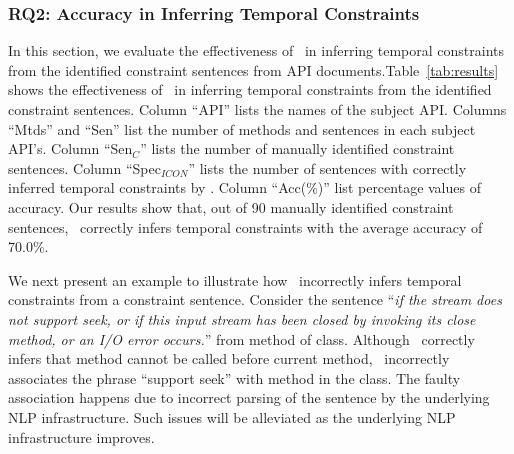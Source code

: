 %
%

\subsubsection{RQ2: Accuracy in Inferring Temporal Constraints}

In this section, we evaluate the effectiveness of \tool\ in inferring temporal constraints from the identified constraint sentences from API documents.Table~\ref{tab:results} shows the effectiveness of \tool\ in inferring temporal constraints from the identified constraint sentences.
Column ``API'' lists the names of the subject API. 
Columns ``Mtds'' and ``Sen'' list the number of methods and sentences in each subject API's.
Column ``Sen$_C$'' lists the number of manually identified constraint sentences.
Column ``Spec$_{ICON}$'' lists the number of sentences with correctly inferred temporal constraints by \tool. 
Column ``Acc(\%)'' list percentage values of accuracy. 
Our results show that, out of 90 manually identified constraint sentences, \tool\ correctly infers temporal constraints with the average accuracy of 70.0\%.

We next present an example to illustrate how \tool\ incorrectly infers temporal constraints from a constraint sentence. Consider the sentence ``\textit{if the stream does not support seek, or if this input stream has been closed by invoking its close method, or an I/O error occurs.}'' from  method of  class. Although \tool\ correctly infers that method  cannot be called before current method, \tool\ incorrectly associates the phrase ``support seek'' with method  in the class. The faulty association happens due to incorrect parsing of the sentence by the underlying NLP infrastructure. Such issues will be alleviated as the underlying NLP infrastructure improves.   


